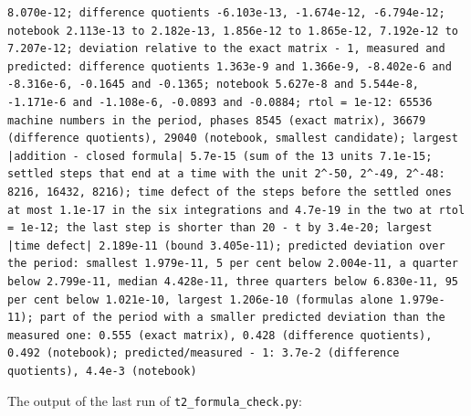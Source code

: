 \documentclass[
  10pt,
]{article}
\begin{document}
\begin{verbatim}
8.070e-12; difference quotients -6.103e-13, -1.674e-12, -6.794e-12; notebook 2.113e-13 to 2.182e-13, 1.856e-12 to 1.865e-12, 7.192e-12 to 7.207e-12; deviation relative to the exact matrix - 1, measured and predicted: difference quotients 1.363e-9 and 1.366e-9, -8.402e-6 and -8.316e-6, -0.1645 and -0.1365; notebook 5.627e-8 and 5.544e-8, -1.171e-6 and -1.108e-6, -0.0893 and -0.0884; rtol = 1e-12: 65536 machine numbers in the period, phases 8545 (exact matrix), 36679 (difference quotients), 29040 (notebook, smallest candidate); largest |addition - closed formula| 5.7e-15 (sum of the 13 units 7.1e-15; settled steps that end at a time with the unit 2^-50, 2^-49, 2^-48: 8216, 16432, 8216); time defect of the steps before the settled ones at most 1.1e-17 in the six integrations and 4.7e-19 in the two at rtol = 1e-12; the last step is shorter than 20 - t by 3.4e-20; largest |time defect| 2.189e-11 (bound 3.405e-11); predicted deviation over the period: smallest 1.979e-11, 5 per cent below 2.004e-11, a quarter below 2.799e-11, median 4.428e-11, three quarters below 6.830e-11, 95 per cent below 1.021e-10, largest 1.206e-10 (formulas alone 1.979e-11); part of the period with a smaller predicted deviation than the measured one: 0.555 (exact matrix), 0.428 (difference quotients), 0.492 (notebook); predicted/measured - 1: 3.7e-2 (difference quotients), 4.4e-3 (notebook)
\end{verbatim}

The output of the last run of \texttt{t2\_formula\_check.py}:
\end{document}
